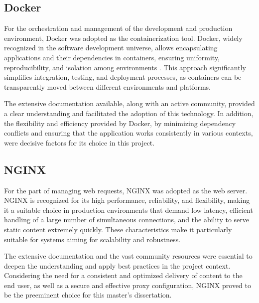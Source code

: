 \subsection{Docker}
For the orchestration and management of the development and production environment, Docker \cite{dockerDocs} was adopted as the containerization tool. Docker, widely recognized in the software development universe, allows encapsulating applications and their dependencies in containers, ensuring uniformity, reproducibility, and isolation among environments \cite{dockerOverview}. This approach significantly simplifies integration, testing, and deployment processes, as containers can be transparently moved between different environments and platforms.

The extensive documentation available, along with an active community, provided a clear understanding and facilitated the adoption of this technology. In addition, the flexibility and efficiency provided by Docker, by minimizing dependency conflicts and ensuring that the application works consistently in various contexts, were decisive factors for its choice in this project.

\subsection{NGINX}
For the part of managing web requests, NGINX \cite{nginxDocs} was adopted as the web server. NGINX is recognized for its high performance, reliability, and flexibility, making it a suitable choice in production environments that demand low latency, efficient handling of a large number of simultaneous connections, and the ability to serve static content extremely quickly. These characteristics make it particularly suitable for systems aiming for scalability and robustness.

The extensive documentation and the vast community resources were essential to deepen the understanding and apply best practices in the project context. Considering the need for a consistent and optimized delivery of content to the end user, as well as a secure and effective proxy configuration, NGINX proved to be the preeminent choice for this master's dissertation.






